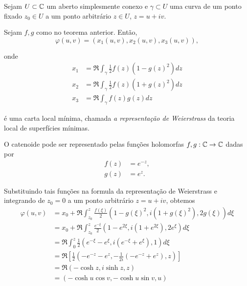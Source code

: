 \begin{definicao}
	Sejam $U \subset \mathbb{C}$ um aberto simplesmente conexo e $\gamma \subset U$ uma curva de um ponto fixado $z_0 \in U$ a um ponto arbitrário $z \in U$, $z = u + iv$.
	
	Sejam $f,g$ como no teorema anterior. Então,
	\begin{equation*}
	\varphi(u,v) = (x_1(u,v), x_2(u,v), x_3(u,v)),
	\end{equation*}
	
	onde
	\begin{align*}
	x_1 &= \Re \int_{\gamma} \frac{1}{2} f(z) (1 - g(z)^2) dz\\
	x_2 &= \Re \int_{\gamma} \frac{1}{2} f(z) (1 + g(z)^2) dz\\
	x_3 &= \Re \int_{\gamma} f(z) g(z) dz
	\end{align*}
	
	é uma carta local mínima, chamada \emph{a representação de Weierstrass} da teoria local de superfícies mínimas.
\end{definicao}

\begin{exemplo}[Catenoide]
	O catenoide pode ser representado pelas funções holomorfas $f, g: \mathbb{C} \rightarrow \mathbb{C}$ dadas por
	\begin{align*}
	f(z) &= e^{-z},\\
	g(z) &= e^z.
	\end{align*}
	
	Substituindo tais funções na formula da representação de Weierstrass e integrando de $z_0 = 0$ a um ponto arbitrário $z = u + iv$, obtemos
	\begin{align*}
	\varphi(u,v) &= x_0 + \Re \int_{z_0}^{z} \frac{f(\xi)}{2} (1 - g(\xi)^2, i (1 + g(\xi)^2), 2 g(\xi)) d\xi\\
	&= x_0 + \Re \int_{z_0}^{z} \frac{e^{-\xi}}{2} (1 - e^{2\xi}, i (1 + e^{2\xi}), 2e^{\xi}) d\xi\\
	&= \Re \int_{0}^{z} \frac{1}{2} (e^{-\xi} - e^{\xi}, i (e^{-\xi} + e^{\xi}), 1) d\xi\\
	&= \Re \left[ \frac{1}{2} \left(-e^{-z} - e^z, -\frac{1}{2i} (-e^{-z} + e^z), z \right) \right] \\
	&= \Re \left( -\cosh z, i \sinh z, z \right) \\
	&= \left( -\cosh u \cos v, -\cosh u \sin v, u \right)
	\end{align*} 
\end{exemplo}

